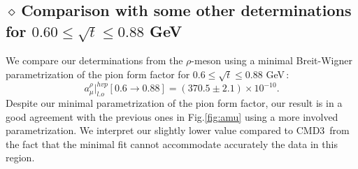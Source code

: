 \documentclass[review]{elsarticle}
\def\beq{\begin{equation}}
\def\eeq{\end{equation}}
\def\d{$\diamond~$}
\begin{document}
\subsection*{\hspace*{0.5cm}\d Comparison with some other determinations for $0.60\leq \sqrt{t}\leq 0.88$ GeV}
We compare our determinations from the $\rho$-meson using a minimal Breit-Wigner parametrization of the pion form factor for $0.6\leq \sqrt{t}\leq 0.88$ GeV\,:
\beq
a_\mu^{\rho}\vert^{hvp}_{l.o}[0.6\to 0.88]=(370.5\pm 2.1)\times 10^{-10}.
\label{eq:compare}
\eeq
\vspace*{-0.10cm}
 Despite our minimal parametrization of the pion form factor, our result is in a good agreement 
 with the previous ones in Fig.\ref{fig:amu} using  a more involved parametrization. We interpret our slightly lower value compared to CMD3\,\cite{CMD3} from the fact that the minimal fit cannot accommodate accurately the data in this region.  

\end{document}
